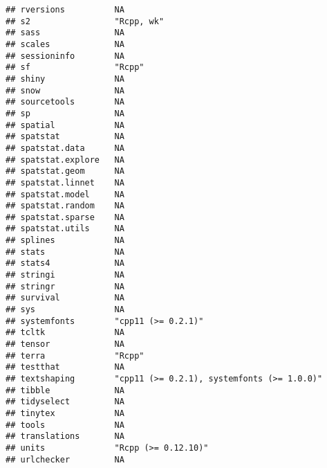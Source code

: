\documentclass[
]{article}
\begin{document}
\begin{verbatim}
## rversions          NA                                        
## s2                 "Rcpp, wk"                                
## sass               NA                                        
## scales             NA                                        
## sessioninfo        NA                                        
## sf                 "Rcpp"                                    
## shiny              NA                                        
## snow               NA                                        
## sourcetools        NA                                        
## sp                 NA                                        
## spatial            NA                                        
## spatstat           NA                                        
## spatstat.data      NA                                        
## spatstat.explore   NA                                        
## spatstat.geom      NA                                        
## spatstat.linnet    NA                                        
## spatstat.model     NA                                        
## spatstat.random    NA                                        
## spatstat.sparse    NA                                        
## spatstat.utils     NA                                        
## splines            NA                                        
## stats              NA                                        
## stats4             NA                                        
## stringi            NA                                        
## stringr            NA                                        
## survival           NA                                        
## sys                NA                                        
## systemfonts        "cpp11 (>= 0.2.1)"                        
## tcltk              NA                                        
## tensor             NA                                        
## terra              "Rcpp"                                    
## testthat           NA                                        
## textshaping        "cpp11 (>= 0.2.1), systemfonts (>= 1.0.0)"
## tibble             NA                                        
## tidyselect         NA                                        
## tinytex            NA                                        
## tools              NA                                        
## translations       NA                                        
## units              "Rcpp (>= 0.12.10)"                       
## urlchecker         NA                                        

\end{verbatim}
\end{document}
